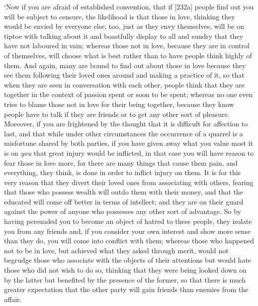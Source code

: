 ‘Now if you are afraid of established convention, that if {[}232a{]}
people find out you will be subject to censure, the likelihood is that
those in love, thinking they would be envied by everyone else, too, just
as they envy themselves, will be on tiptoe with talking about it and
boastfully display to all and sundry that they have not laboured in
vain; whereas those not in love,  because they are in control of
themselves, will choose what is best rather than to have people think
highly of them. And again, many are bound to find out about those in
love because they see them following their loved ones around and making
a practice  of it, so that when they are seen in conversation
with each other, people think that they are together in the context of
passion spent or soon to be spent; whereas no one even tries to blame
those not in love for their being together, because they  know
people have to talk if they are friends or to get any other sort of
pleasure. Moreover, if you are frightened by the thought that it is
difficult for affection to last, and that while under other
circumstances the occurrence of a quarrel is a misfortune shared by both
parties, if you have given away what you value  most it is on
{\em you} that great injury would be inflicted, in that case you will
have reason to fear those in love more, for there are many things that
cause them pain, and everything, they think, is done in order to inflict
injury on them. It is for this  very reason that they divert
their loved ones from associating with others, fearing that those who
possess wealth will outdo them with their money, and that the educated
will come off better in terms of intellect; and they are on their guard
against the power of anyone who possesses any other sort of advantage.
 So by having persuaded you to become an object of hatred to
these people, they isolate you from any friends and, if you consider
your own interest and show more sense than they do, you will come into
conflict with them; whereas those who happened not to be in love, but
achieved what they asked  through merit, would not begrudge
those who associate with the objects of their attentions but would hate
those who did not wish to do so, thinking that they were being looked
down on by the latter but benefited by the presence of the former, so
that there is much greater expectation that the other party will
 gain friends than enemies from the affair.

